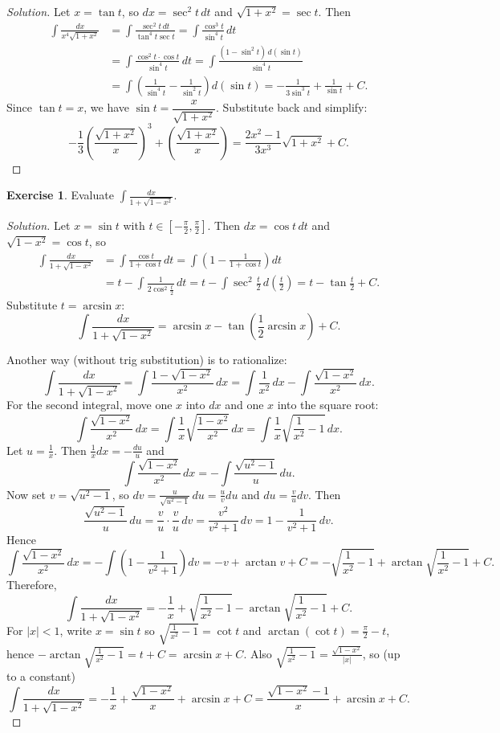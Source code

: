 \documentclass[11pt]{article}
\theoremstyle{definition}
\newtheorem{exercise}{Exercise}[section]
\newenvironment{solution}{\begin{proof}[Solution]}{\end{proof}}
\begin{document}
\begin{solution}
Let $x=\tan t$, so $dx=\sec^2 t\,dt$ and $\sqrt{1+x^2}=\sec t$. Then
\begin{align*}
\int\frac{dx}{x^4\sqrt{1+x^2}}
&=\int\frac{\sec^2 t\,dt}{\tan^4 t\sec t}
=\int\frac{\cos^3 t}{\sin^4 t}\,dt \\
&=\int\frac{\cos^2 t\cdot\cos t}{\sin^4 t}\,dt
=\int\frac{(1-\sin^2 t)\,d(\sin t)}{\sin^4 t} \\
&=\int\left(\frac{1}{\sin^4 t}-\frac{1}{\sin^2 t}\right)d(\sin t)
=-\frac{1}{3\sin^3 t}+\frac{1}{\sin t}+C.
\end{align*}
Since $\tan t=x$, we have $\sin t=\dfrac{x}{\sqrt{1+x^2}}$. Substitute back and simplify:
\[
-\frac{1}{3}\left(\frac{\sqrt{1+x^2}}{x}\right)^3+\left(\frac{\sqrt{1+x^2}}{x}\right)
=\frac{2x^2-1}{3x^3}\sqrt{1+x^2}+C.
\]
\end{solution}

\begin{exercise}
Evaluate $\displaystyle \int \frac{dx}{1+\sqrt{1-x^2}}$.
\end{exercise}

\begin{solution}
Let $x=\sin t$ with $t\in\left[-\frac{\pi}{2},\frac{\pi}{2}\right]$. Then $dx=\cos t\,dt$ and $\sqrt{1-x^2}=\cos t$, so
\begin{align*}
\int\frac{dx}{1+\sqrt{1-x^2}}
&=\int\frac{\cos t}{1+\cos t}\,dt
=\int\left(1-\frac{1}{1+\cos t}\right)dt \\
&=t-\int\frac{1}{2\cos^2\frac{t}{2}}\,dt
=t-\int \sec^2\frac{t}{2}\,d\!\left(\frac{t}{2}\right)
=t-\tan\frac{t}{2}+C.
\end{align*}
Substitute $t=\arcsin x$:
\[
\int\frac{dx}{1+\sqrt{1-x^2}}=\arcsin x-\tan\left(\frac{1}{2}\arcsin x\right)+C.
\]

Another way (without trig substitution) is to rationalize:
\[
\int\frac{dx}{1+\sqrt{1-x^2}}
=\int \frac{1-\sqrt{1-x^2}}{x^2}\,dx
=\int \frac{1}{x^2}\,dx-\int \frac{\sqrt{1-x^2}}{x^2}\,dx.
\]
For the second integral, move one $x$ into $dx$ and one $x$ into the square root:
\[
\int \frac{\sqrt{1-x^2}}{x^2}\,dx=\int \frac{1}{x}\sqrt{\frac{1-x^2}{x^2}}\,dx=\int \frac{1}{x}\sqrt{\frac{1}{x^2}-1}\,dx.
\]
Let $u=\frac{1}{x}$. Then $\frac{1}{x}dx=-\frac{du}{u}$ and
\[
\int \frac{\sqrt{1-x^2}}{x^2}\,dx=-\int \frac{\sqrt{u^2-1}}{u}\,du.
\]
Now set $v=\sqrt{u^2-1}$, so $dv=\frac{u}{\sqrt{u^2-1}}\,du=\frac{u}{v}du$ and $du=\frac{v}{u}dv$. Then
\[
\frac{\sqrt{u^2-1}}{u}\,du=\frac{v}{u}\cdot\frac{v}{u}\,dv=\frac{v^2}{v^2+1}\,dv=1-\frac{1}{v^2+1}\,dv.
\]
Hence
\[
\int \frac{\sqrt{1-x^2}}{x^2}\,dx
=-\int\left(1-\frac{1}{v^2+1}\right)dv
=-v+\arctan v+C
=-\sqrt{\frac{1}{x^2}-1}+\arctan\sqrt{\frac{1}{x^2}-1}+C.
\]
Therefore,
\[
\int\frac{dx}{1+\sqrt{1-x^2}}=-\frac{1}{x}+\sqrt{\frac{1}{x^2}-1}-\arctan\sqrt{\frac{1}{x^2}-1}+C.
\]
For $|x|<1$, write $x=\sin t$ so $\sqrt{\frac{1}{x^2}-1}=\cot t$ and $\arctan(\cot t)=\frac{\pi}{2}-t$, hence $-\arctan\sqrt{\frac{1}{x^2}-1}=t+C=\arcsin x+C$.
Also $\sqrt{\frac{1}{x^2}-1}=\frac{\sqrt{1-x^2}}{|x|}$, so (up to a constant)
\[
\int\frac{dx}{1+\sqrt{1-x^2}}=-\frac{1}{x}+\frac{\sqrt{1-x^2}}{x}+\arcsin x+C
=\frac{\sqrt{1-x^2}-1}{x}+\arcsin x+C.
\]
\end{solution}
\end{document}
